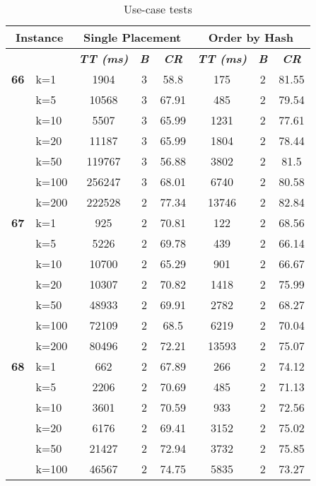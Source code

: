     \begin{table}[htbp]
    \caption{Use-case tests}
    \begin{tabular}{|l|l|c|c|c|c|c|c|}
    
    \multicolumn{ 2}{|c|}{\textbf{Instance}} & \multicolumn{ 3}{c|}{\textbf{Single Placement}} & \multicolumn{ 3}{c|}{\textbf{Order by Hash}} \\ \hline
    \multicolumn{ 2}{|l|}{} & \textbf{\textit{TT (ms)}} & \textbf{\textit{B}} & \textbf{\textit{CR}} & \textbf{\textit{TT (ms)}} & \textbf{\textit{B}} & \textbf{\textit{CR}} \\ \hline
    \multicolumn{1}{|r|}{\textbf{66}} & k=1 & 1904 & 3 & 58.8 & 175 & 2 & 81.55 \\ 
     & k=5 & 10568 & 3 & 67.91 & 485 & 2 & 79.54 \\ 
     & k=10 & 5507 & 3 & 65.99 & 1231 & 2 & 77.61 \\ 
     & k=20 & 11187 & 3 & 65.99 & 1804 & 2 & 78.44 \\ 
     & k=50 & 119767 & 3 & 56.88 & 3802 & 2 & 81.5 \\ 
     & k=100 & 256247 & 3 & 68.01 & 6740 & 2 & 80.58 \\ 
     & k=200 & 222528 & 2 & 77.34 & 13746 & 2 & 82.84 \\ \hline
    \multicolumn{1}{|r|}{\textbf{67}} & k=1 & 925 & 2 & 70.81 & 122 & 2 & 68.56 \\ 
     & k=5 & 5226 & 2 & 69.78 & 439 & 2 & 66.14 \\ 
     & k=10 & 10700 & 2 & 65.29 & 901 & 2 & 66.67 \\ 
     & k=20 & 10307 & 2 & 70.82 & 1418 & 2 & 75.99 \\ 
     & k=50 & 48933 & 2 & 69.91 & 2782 & 2 & 68.27 \\ 
     & k=100 & 72109 & 2 & 68.5 & 6219 & 2 & 70.04 \\ 
     & k=200 & 80496 & 2 & 72.21 & 13593 & 2 & 75.07 \\ \hline
    \multicolumn{1}{|r|}{\textbf{68}} & k=1 & 662 & 2 & 67.89 & 266 & 2 & 74.12 \\ 
     & k=5 & 2206 & 2 & 70.69 & 485 & 2 & 71.13 \\ 
     & k=10 & 3601 & 2 & 70.59 & 933 & 2 & 72.56 \\ 
     & k=20 & 6176 & 2 & 69.41 & 3152 & 2 & 75.02 \\ 
     & k=50 & 21427 & 2 & 72.94 & 3732 & 2 & 75.85 \\ 
     & k=100 & 46567 & 2 & 74.75 & 5835 & 2 & 73.27 \\ 

\end{tabular}
\end{table}

